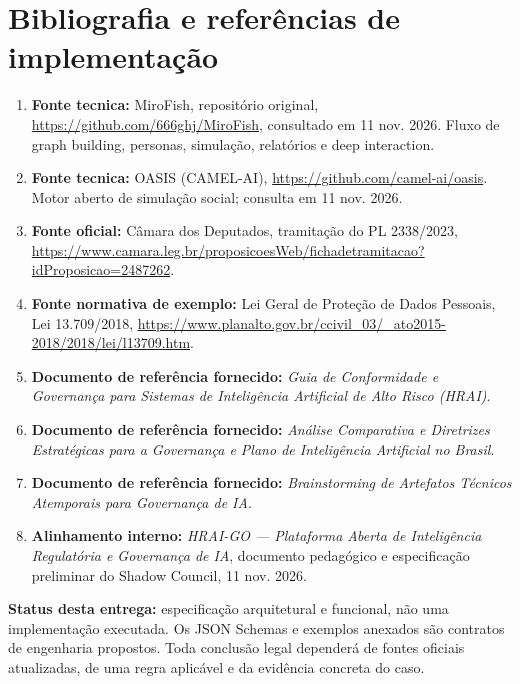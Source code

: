 \documentclass[10.5pt,a4paper,oneside]{article}
\begin{document}
\section{Bibliografia e referências de implementação}
\begin{enumerate}
\item \textbf{Fonte tecnica:} MiroFish, reposit\'orio original, \url{https://github.com/666ghj/MiroFish}, consultado em 11 nov. 2026. Fluxo de graph building, personas, simula\c c\~ao, relat\'orios e deep interaction.
\item \textbf{Fonte tecnica:} OASIS (CAMEL-AI), \url{https://github.com/camel-ai/oasis}. Motor aberto de simula\c c\~ao social; consulta em 11 nov. 2026.
\item \textbf{Fonte oficial:} C\^amara dos Deputados, tramita\c c\~ao do PL 2338/2023, \url{https://www.camara.leg.br/proposicoesWeb/fichadetramitacao?idProposicao=2487262}.
\item \textbf{Fonte normativa de exemplo:} Lei Geral de Prote\c c\~ao de Dados Pessoais, Lei 13.709/2018, \url{https://www.planalto.gov.br/ccivil_03/_ato2015-2018/2018/lei/l13709.htm}.
\item \textbf{Documento de refer\^encia fornecido:} \emph{Guia de Conformidade e Governan\c ca para Sistemas de Intelig\^encia Artificial de Alto Risco (HRAI)}.
\item \textbf{Documento de refer\^encia fornecido:} \emph{An\'alise Comparativa e Diretrizes Estrat\'egicas para a Governan\c ca e Plano de Intelig\^encia Artificial no Brasil}.
\item \textbf{Documento de refer\^encia fornecido:} \emph{Brainstorming de Artefatos T\'ecnicos Atemporais para Governan\c ca de IA}.
\item \textbf{Alinhamento interno:} \emph{HRAI-GO --- Plataforma Aberta de Intelig\^encia Regulat\'oria e Governan\c ca de IA}, documento pedag\'ogico e especifica\c c\~ao preliminar do Shadow Council, 11 nov. 2026.
\end{enumerate}
\begin{infobox}
\textbf{Status desta entrega:} especifica\c c\~ao arquitetural e funcional, n\~ao uma implementa\c c\~ao executada. Os JSON Schemas e exemplos anexados s\~ao contratos de engenharia propostos. Toda conclus\~ao legal depender\'a de fontes oficiais atualizadas, de uma regra aplic\'avel e da evid\^encia concreta do caso.
\end{infobox}
\end{document}
